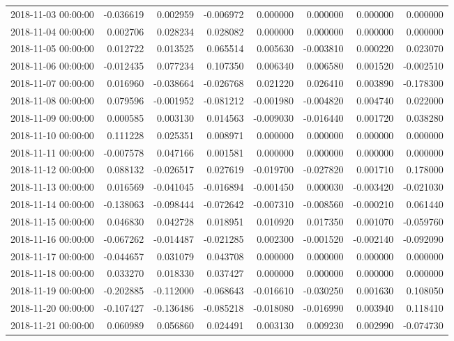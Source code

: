 \begin{tabular}{lrrrrrrr}
2018-11-03 00:00:00 & -0.036619 & 0.002959 & -0.006972 & 0.000000 & 0.000000 & 0.000000 & 0.000000 \\
2018-11-04 00:00:00 & 0.002706 & 0.028234 & 0.028082 & 0.000000 & 0.000000 & 0.000000 & 0.000000 \\
2018-11-05 00:00:00 & 0.012722 & 0.013525 & 0.065514 & 0.005630 & -0.003810 & 0.000220 & 0.023070 \\
2018-11-06 00:00:00 & -0.012435 & 0.077234 & 0.107350 & 0.006340 & 0.006580 & 0.001520 & -0.002510 \\
2018-11-07 00:00:00 & 0.016960 & -0.038664 & -0.026768 & 0.021220 & 0.026410 & 0.003890 & -0.178300 \\
2018-11-08 00:00:00 & 0.079596 & -0.001952 & -0.081212 & -0.001980 & -0.004820 & 0.004740 & 0.022000 \\
2018-11-09 00:00:00 & 0.000585 & 0.003130 & 0.014563 & -0.009030 & -0.016440 & 0.001720 & 0.038280 \\
2018-11-10 00:00:00 & 0.111228 & 0.025351 & 0.008971 & 0.000000 & 0.000000 & 0.000000 & 0.000000 \\
2018-11-11 00:00:00 & -0.007578 & 0.047166 & 0.001581 & 0.000000 & 0.000000 & 0.000000 & 0.000000 \\
2018-11-12 00:00:00 & 0.088132 & -0.026517 & 0.027619 & -0.019700 & -0.027820 & 0.001710 & 0.178000 \\
2018-11-13 00:00:00 & 0.016569 & -0.041045 & -0.016894 & -0.001450 & 0.000030 & -0.003420 & -0.021030 \\
2018-11-14 00:00:00 & -0.138063 & -0.098444 & -0.072642 & -0.007310 & -0.008560 & -0.000210 & 0.061440 \\
2018-11-15 00:00:00 & 0.046830 & 0.042728 & 0.018951 & 0.010920 & 0.017350 & 0.001070 & -0.059760 \\
2018-11-16 00:00:00 & -0.067262 & -0.014487 & -0.021285 & 0.002300 & -0.001520 & -0.002140 & -0.092090 \\
2018-11-17 00:00:00 & -0.044657 & 0.031079 & 0.043708 & 0.000000 & 0.000000 & 0.000000 & 0.000000 \\
2018-11-18 00:00:00 & 0.033270 & 0.018330 & 0.037427 & 0.000000 & 0.000000 & 0.000000 & 0.000000 \\
2018-11-19 00:00:00 & -0.202885 & -0.112000 & -0.068643 & -0.016610 & -0.030250 & 0.001630 & 0.108050 \\
2018-11-20 00:00:00 & -0.107427 & -0.136486 & -0.085218 & -0.018080 & -0.016990 & 0.003940 & 0.118410 \\
2018-11-21 00:00:00 & 0.060989 & 0.056860 & 0.024491 & 0.003130 & 0.009230 & 0.002990 & -0.074730 \\

\end{tabular}
